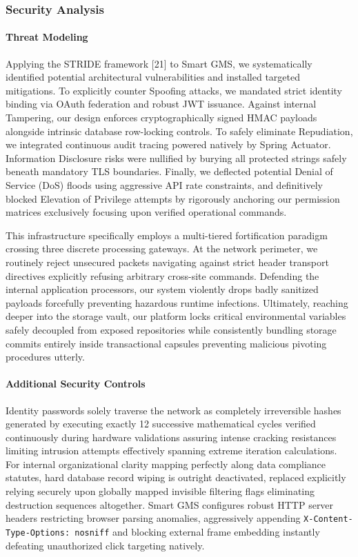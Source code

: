 \subsubsection*{Security Analysis}\label{security-analysis}

\paragraph*{Threat Modeling}\label{threat-modeling}

Applying the STRIDE framework {[}21{]} to Smart GMS, we systematically
identified potential architectural vulnerabilities and installed
targeted mitigations. To explicitly counter Spoofing attacks, we
mandated strict identity binding via OAuth federation and robust JWT
issuance. Against internal Tampering, our design enforces
cryptographically signed HMAC payloads alongside intrinsic database
row-locking controls. To safely eliminate Repudiation, we integrated
continuous audit tracing powered natively by Spring Actuator.
Information Disclosure risks were nullified by burying all protected
strings safely beneath mandatory TLS boundaries. Finally, we deflected
potential Denial of Service (DoS) floods using aggressive API rate
constraints, and definitively blocked Elevation of Privilege attempts by
rigorously anchoring our permission matrices exclusively focusing upon
verified operational commands.

This infrastructure specifically employs a multi-tiered fortification
paradigm crossing three discrete processing gateways. At the network
perimeter, we routinely reject unsecured packets navigating against
strict header transport directives explicitly refusing arbitrary
cross-site commands. Defending the internal application processors, our
system violently drops badly sanitized payloads forcefully preventing
hazardous runtime infections. Ultimately, reaching deeper into the
storage vault, our platform locks critical environmental variables
safely decoupled from exposed repositories while consistently bundling
storage commits entirely inside transactional capsules preventing
malicious pivoting procedures utterly.

\paragraph*{Additional Security
Controls}\label{additional-security-controls}

Identity passwords solely traverse the network as completely
irreversible hashes generated by executing exactly 12 successive
mathematical cycles verified continuously during hardware validations
assuring intense cracking resistances limiting intrusion attempts
effectively spanning extreme iteration calculations. For internal
organizational clarity mapping perfectly along data compliance statutes,
hard database record wiping is outright deactivated, replaced explicitly
relying securely upon globally mapped invisible filtering flags
eliminating destruction sequences altogether. Smart GMS configures
robust HTTP server headers restricting browser parsing anomalies,
aggressively appending \texttt{X-Content-Type-Options: nosniff} and
blocking external frame embedding instantly defeating unauthorized click
targeting natively.

